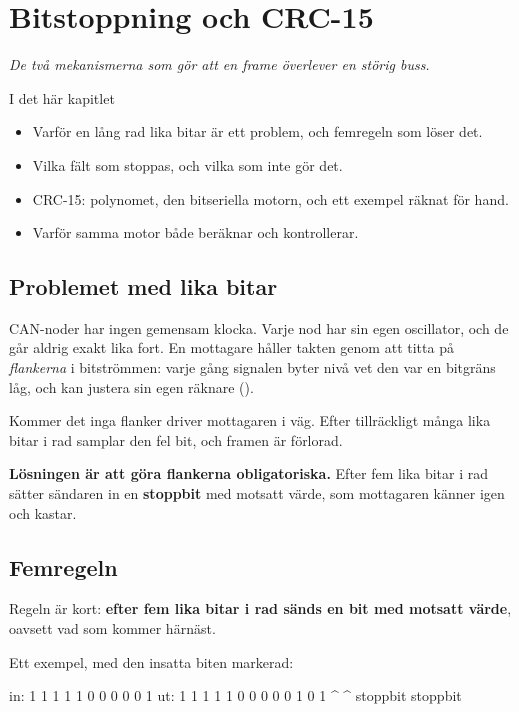\chapter{Bitstoppning och CRC-15}
\label{ch:stuffing}

{\large\itshape De två mekanismerna som gör att en frame överlever en störig buss.\par}

\begin{chapterbox}{I det här kapitlet}
\begin{itemize}
  \item Varför en lång rad lika bitar är ett problem, och femregeln som löser det.
  \item Vilka fält som stoppas, och vilka som inte gör det.
  \item CRC-15: polynomet, den bitseriella motorn, och ett exempel räknat för hand.
  \item Varför samma motor både beräknar och kontrollerar.
\end{itemize}
\end{chapterbox}

\section{Problemet med lika bitar}

CAN-noder har ingen gemensam klocka. Varje nod har sin egen oscillator, och de går aldrig exakt
lika fort. En mottagare håller takten genom att titta på \emph{flankerna} i bitströmmen: varje
gång signalen byter nivå vet den var en bitgräns låg, och kan justera sin egen räknare
().

Kommer det inga flanker driver mottagaren i väg. Efter tillräckligt många lika bitar i rad
samplar den fel bit, och framen är förlorad.

\textbf{Lösningen är att göra flankerna obligatoriska.} Efter fem lika bitar i rad sätter
sändaren in en \textbf{stoppbit} med motsatt värde, som mottagaren känner igen och kastar.

\section{Femregeln}

Regeln är kort: \textbf{efter fem lika bitar i rad sänds en bit med motsatt värde}, oavsett vad
som kommer härnäst.

Ett exempel, med den insatta biten markerad:

\begin{console}
in:  1 1 1 1 1 0 0 0 0 0 1
ut:  1 1 1 1 1 0 0 0 0 0 1 0 1
               ^           ^
           stoppbit    stoppbit
\end{console}

